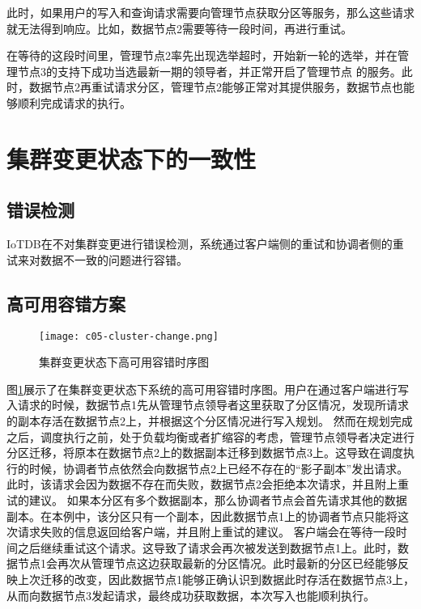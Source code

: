 此时，如果用户的写入和查询请求需要向管理节点获取分区等服务，那么这些请求就无法得到响应。比如，数据节点2需要等待一段时间，再进行重试。

在等待的这段时间里，管理节点2率先出现选举超时，开始新一轮的选举，并在管理节点3的支持下成功当选最新一期的领导者，并正常开启了管理节点 的服务。此时，数据节点2再重试请求分区，管理节点2能够正常对其提供服务，数据节点也能够顺利完成请求的执行。


\section{集群变更状态下的一致性}

\subsection{错误检测}


IoTDB在不对集群变更进行错误检测，系统通过客户端侧的重试和协调者侧的重试来对数据不一致的问题进行容错。


\subsection{高可用容错方案}

\begin{figure}
    \centering
    \texttt{[image: c05-cluster-change.png]}
    \caption{集群变更状态下高可用容错时序图}
    \label{fig:c05-cluster-change}
\end{figure}

图\ref{fig:c05-cluster-change}展示了在集群变更状态下系统的高可用容错时序图。用户在通过客户端进行写入请求的时候，数据节点1先从管理节点领导者这里获取了分区情况，发现所请求的副本存活在数据节点2上，并根据这个分区情况进行写入规划。
然而在规划完成之后，调度执行之前，处于负载均衡或者扩缩容的考虑，管理节点领导者决定进行分区迁移，将原本在数据节点2上的数据副本迁移到数据节点3上。这导致在调度执行的时候，协调者节点依然会向数据节点2上已经不存在的“影子副本”发出请求。
此时，该请求会因为数据不存在而失败，数据节点2会拒绝本次请求，并且附上重试的建议。
如果本分区有多个数据副本，那么协调者节点会首先请求其他的数据副本。在本例中，该分区只有一个副本，因此数据节点1上的协调者节点只能将这次请求失败的信息返回给客户端，并且附上重试的建议。
客户端会在等待一段时间之后继续重试这个请求。这导致了请求会再次被发送到数据节点1上。此时，数据节点1会再次从管理节点这边获取最新的分区情况。此时最新的分区已经能够反映上次迁移的改变，因此数据节点1能够正确认识到数据此时存活在数据节点3上，从而向数据节点3发起请求，最终成功获取数据，本次写入也能顺利执行。

